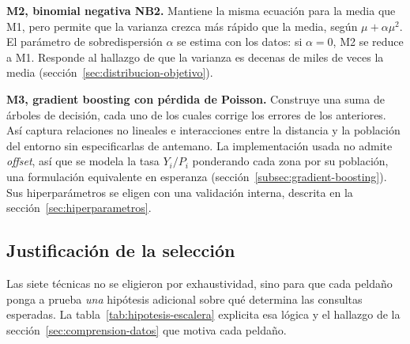 \textbf{M2, binomial negativa NB2.} Mantiene la misma ecuación para la media que M1, pero
permite que la varianza crezca más rápido que la media, según $\mu + \alpha\mu^2$. El
parámetro de sobredispersión $\alpha$ se estima con los datos: si $\alpha = 0$, M2 se
reduce a M1. Responde al hallazgo de que la varianza es decenas de miles de veces la media
(sección~\ref{sec:distribucion-objetivo}).

\textbf{M3, gradient boosting con pérdida de Poisson.} Construye una suma de árboles de
decisión, cada uno de los cuales corrige los errores de los anteriores. Así captura
relaciones no lineales e interacciones entre la distancia y la población del entorno sin
especificarlas de antemano. La implementación usada no admite \emph{offset}, así que se
modela la tasa $Y_i/P_i$ ponderando cada zona por su población, una formulación
equivalente en esperanza (sección~\ref{subsec:gradient-boosting}). Sus hiperparámetros se
eligen con una validación interna, descrita en la sección~\ref{sec:hiperparametros}.

\subsection{Justificación de la selección}
\label{sec:justificacion-algoritmos}

Las siete técnicas no se eligieron por exhaustividad, sino para que cada peldaño ponga a
prueba \emph{una} hipótesis adicional sobre qué determina las consultas esperadas. La
tabla~\ref{tab:hipotesis-escalera} explicita esa lógica y el hallazgo de la
sección~\ref{sec:comprension-datos} que motiva cada peldaño.

